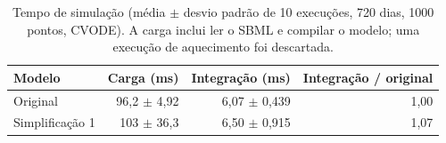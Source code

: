 \begin{table}[htbp]
\centering
\caption{Tempo de simulação (média $\pm$ desvio padrão de 10 execuções, 720 dias, 1000 pontos, CVODE). A carga inclui ler o SBML e compilar o modelo; uma execução de aquecimento foi descartada.}
\label{tab:tempo}
\begin{tabular}{lrrr}
\toprule
Modelo & Carga (ms) & Integração (ms) & Integração / original \\
\midrule
Original & 96{,}2 $\pm$ 4{,}92 & 6{,}07 $\pm$ 0{,}439 & 1{,}00 \\
Simplificação 1 & 103 $\pm$ 36{,}3 & 6{,}50 $\pm$ 0{,}915 & 1{,}07 \\
\bottomrule
\end{tabular}
\end{table}
